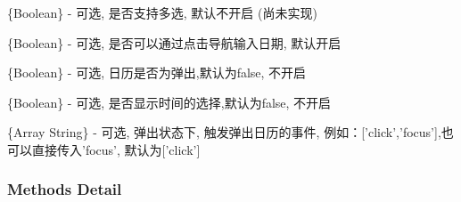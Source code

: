 \documentclass[letterpaper,10pt,english]{sphinxmanual}
\begin{document}

\begin{fulllineitems}
\label{api/component/calendar/index:Calendar.multiSelect}
\{Boolean\} - 可选, 是否支持多选, 默认不开启 (尚未实现)

\end{fulllineitems}



\begin{fulllineitems}
\label{api/component/calendar/index:Calendar.navigator}
\{Boolean\} - 可选, 是否可以通过点击导航输入日期, 默认开启

\end{fulllineitems}



\begin{fulllineitems}
\label{api/component/calendar/index:Calendar.popup}
\{Boolean\} - 可选, 日历是否为弹出,默认为false, 不开启

\end{fulllineitems}



\begin{fulllineitems}
\label{api/component/calendar/index:Calendar.showTime}
\{Boolean\} - 可选, 是否显示时间的选择,默认为false, 不开启

\end{fulllineitems}



\begin{fulllineitems}
\label{api/component/calendar/index:Calendar.triggerType}
\{Array \textbar{} String\} - 可选, 弹出状态下, 触发弹出日历的事件, 例如：{[}'click','focus'{]},也可以直接传入'focus', 默认为{[}'click'{]}

\end{fulllineitems}



\subsubsection{Methods Detail}
\label{api/component/calendar/index:methods-detail}
\end{document}
